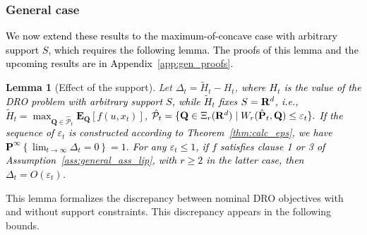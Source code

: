 \documentclass[12pt]{article}
\newcommand{\ie}{{\it i.e.}}
\newcommand{\reals}{{\bf R}}
\newcommand{\prob}{{\mathbf P}}
\newcommand{\unc}{u}
\newcommand{\epsnom}{\varepsilon}
\newtheorem{lemma}{Lemma}[section]  %
\newcommand{\RC}[1]{\textcolor{black}{#1}}
\newcommand{\RC}[1]{\textcolor{blue}{#1}}
\begin{document}
\subsubsection{General case}
\label{sec:general}
\RC{We now extend these results to the maximum-of-concave case with arbitrary  support $S$, which requires the following lemma. The proofs of this lemma and the upcoming results are in Appendix~\ref{app:gen_proofs}.}
\begin{lemma}[Effect of the support]
\label{lem:delta}
    Let $\Delta_t = \tilde{H}_t - H_t$, \RC{where $H_t$ is the value of the \gls{DRO} problem with arbitrary support $S$, while $\tilde{H}_t$ fixes $S = \reals^d$, \ie, $\tilde{H}_t = \max_{\mathbf{Q} \in \hat{\mathcal{P}}_{t}}\mathbf{E}_{\mathbf{Q}}[f(\unc,x_t)]$, $
\hat{\mathcal{P}}_{t}=\{\mathbf{Q} \in \Xi_r({\reals^d})\mid W_r(\hat{\prob}_{t}, \mathbf{Q}) \leq \epsnom_{t}\}.$} 
\RC{If the sequence of $\epsnom_{t}$ is constructed according to Theorem~\ref{thm:calc_eps}, we have  $\prob^{\infty}\left\{ \lim_{t\to\infty} \Delta_t = 0\right \} = 1.$ For any $\epsnom_t \leq 1$, if $f$ satisfies clause 1 or 3 of Assumption~\ref{ass:general_ass_lip}, with $r\geq 2$ in the latter case,  
then $\Delta_t = O(\epsnom_{t})$.}
\end{lemma}
This lemma formalizes the discrepancy between nominal \gls{DRO} objectives with and without support constraints. This discrepancy appears in the following bounds.
\end{document}
